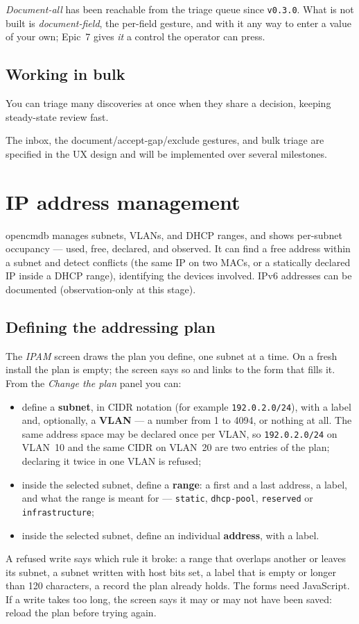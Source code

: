 \documentclass[11pt,oneside,listof=totoc,bibliography=totoc]{scrreprt}
\begin{document}
\begin{planned}
\emph{Document-all} has been reachable from the triage queue since \texttt{v0.3.0}. What is not
built is \emph{document-field}, the per-field gesture, and with it any way to enter a value of
your own; Epic~7 gives \emph{it} a control the operator can press.
\end{planned}

\section{Working in bulk}
You can triage many discoveries at once when they share a decision, keeping steady-state
review fast.

\begin{planned}
The inbox, the document/accept-gap/exclude gestures, and bulk triage are specified in the UX
design and will be implemented over several milestones.
\end{planned}

\chapter{IP address management}
opencmdb manages subnets, VLANs, and DHCP ranges, and shows per-subnet occupancy — used,
free, declared, and observed. It can find a free address within a subnet and detect
conflicts (the same IP on two MACs, or a statically declared IP inside a DHCP range),
identifying the devices involved. IPv6 addresses can be documented (observation-only at
this stage).

\section{Defining the addressing plan}
The \emph{IPAM} screen draws the plan you define, one subnet at a time. On a fresh install the
plan is empty; the screen says so and links to the form that fills it. From the
\emph{Change the plan} panel you can:
\begin{itemize}
  \item define a \textbf{subnet}, in CIDR notation (for example \texttt{192.0.2.0/24}), with a
        label and, optionally, a \textbf{VLAN} --- a number from 1 to 4094, or nothing at all.
        The same address space may be declared once per VLAN, so \texttt{192.0.2.0/24} on VLAN~10
        and the same CIDR on VLAN~20 are two entries of the plan; declaring it twice in one VLAN is
        refused;
  \item inside the selected subnet, define a \textbf{range}: a first and a last address, a label,
        and what the range is meant for --- \texttt{static}, \texttt{dhcp-pool},
        \texttt{reserved} or \texttt{infrastructure};
  \item inside the selected subnet, define an individual \textbf{address}, with a label.
\end{itemize}
A refused write says which rule it broke: a range that overlaps another or leaves its subnet, a
subnet written with host bits set, a label that is empty or longer than 120 characters, a record
the plan already holds. The forms need JavaScript. If a write takes too long, the screen says it
may or may not have been saved: reload the plan before trying again.
\end{document}
